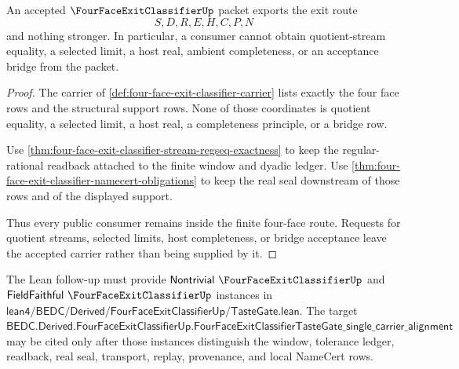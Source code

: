 \begin{theorem}
\label{thm:four-face-exit-classifier-no-completeness-escape}
An accepted $\FourFaceExitClassifierUp$ packet exports the exit route
$$
S,D,R,E,H,C,P,N
$$
and nothing stronger. In particular, a consumer cannot obtain quotient-stream equality, a selected limit, a host real, ambient completeness, or an acceptance bridge from the packet.
\end{theorem}
\begin{proof}
The carrier of \autoref{def:four-face-exit-classifier-carrier} lists exactly the four face rows and the structural support rows. None of those coordinates is quotient equality, a selected limit, a host real, a completeness principle, or a bridge row.

Use \autoref{thm:four-face-exit-classifier-stream-regseq-exactness} to keep the regular-rational readback attached to the finite window and dyadic ledger. Use \autoref{thm:four-face-exit-classifier-namecert-obligations} to keep the real seal downstream of those rows and of the displayed support.

Thus every public consumer remains inside the finite four-face route. Requests for quotient streams, selected limits, host completeness, or bridge acceptance leave the accepted carrier rather than being supplied by it.
\end{proof}



The Lean follow-up must provide $\mathsf{Nontrivial}\ \FourFaceExitClassifierUp$ and $\mathsf{FieldFaithful}\ \FourFaceExitClassifierUp$ instances in $\mathsf{lean4/BEDC/Derived/FourFaceExitClassifierUp/TasteGate.lean}$. The target $\mathsf{BEDC.Derived.FourFaceExitClassifierUp.FourFaceExitClassifierTasteGate\_single\_carrier\_alignment}$ may be cited only after those instances distinguish the window, tolerance ledger, readback, real seal, transport, replay, provenance, and local NameCert rows.

